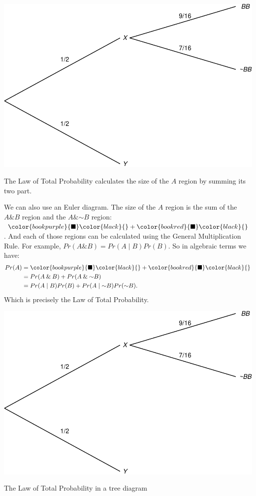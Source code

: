 \documentclass[justified]{tufte-book}
\newcommand{\given}{\mid}
\renewcommand{\neg}{\mathbin{\sim}}
\renewcommand{\wedge}{\mathbin{\&}}
\newcommand{\p}{Pr}
\theoremstyle{definition}
\theoremstyle{definition}
\theoremstyle{definition}
\theoremstyle{remark}
\begin{document}
\begin{marginfigure}
\includegraphics{_main_files/figure-latex/unnamed-chunk-71-1} \caption[The Law of Total Probability calculates the size of the $A$ region by summing its two part]{The Law of Total Probability calculates the size of the $A$ region by summing its two part.}\label{fig:unnamed-chunk-71}
\end{marginfigure}

We can also use an Euler diagram. The size of the \(A\) region is the
sum of the \(A \wedge B\) region and the \(A \wedge \neg B\) region:
\(\color{bookpurple}{\blacksquare}\color{black}{} + \color{bookred}{\blacksquare}\color{black}{}\).
And each of those regions can be calculated using the General
Multiplication Rule. For example,
\(\p(A \wedge B) = \p(A \given B) \p(B)\). So in algebraic terms we
have: \[
  \begin{aligned}
    \p(A) &= \color{bookpurple}{\blacksquare}\color{black}{} 
             + \color{bookred}{\blacksquare}\color{black}{}\\
          &= \p(A \wedge B) + \p(A \wedge \neg B)\\
          &= \p(A \given B) \p(B) + \p(A \given \neg B) \p(\neg B).
  \end{aligned}
\] Which is precisely the Law of Total Probability.

\begin{marginfigure}
\includegraphics{_main_files/figure-latex/unnamed-chunk-72-1} \caption[The Law of Total Probability in a tree diagram]{The Law of Total Probability in a tree diagram}\label{fig:unnamed-chunk-72}
\end{marginfigure}
\end{document}
